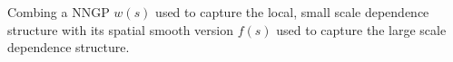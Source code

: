 \documentclass[
12pt, %
a4paper, %
oneside, %
headinclude,footinclude, %
BCOR5mm, %
]{scrartcl}
\begin{document}
%

%

Combing a NNGP $w(s)$ used to capture the \textcolor[rgb]{0.50,0.50,0.50}{local, small scale dependence structure} with its spatial smooth version $f(s)$ used to capture the \textcolor[rgb]{0.50,0.50,0.50}{large scale dependence structure}.
\end{document}
